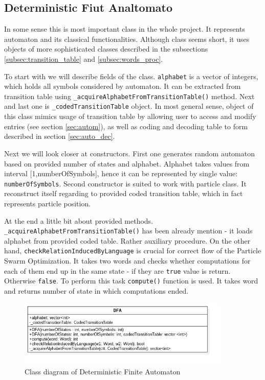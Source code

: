 \documentclass{article}
\begin{document}



%
%

\subsection{Deterministic Fiut Analtomato}
In some sense this is most important class in the whole project. It represents automaton and its classical functionalities. Although class seems short, it uses objects of more sophisticated classes described in the subsections \ref{subsec:transition_table} and \ref{subsec:words_proc}. 

To start with we will describe fields of the class. \texttt{alphabet} is a vector of integers, which holds all symbols considered by automaton. It can be extracted from transition table using \texttt{\_acquireAlphabetFromTransitionTable()} method. Next and last one is \texttt{\_codedTransitionTable} object. In most general sense, object of this class mimics usage of transition table by allowing user to access and modify entries (see section \ref{sec:autom}), as well as coding and decoding table to form described in section \ref{sec:auto_dec}. 

Next we will look closer at constructors. First one generates random automaton based on provided number of states and alphabet. Alphabet takes values from interval [1,numberOfSymbols], hence it can be represented by single value: \texttt{numberOfSymbols}. Second constructor is suited to work with particle class. It reconstruct itself regarding to provided coded transition table, which in fact represents particle position. 

At the end a little bit about provided methods. \texttt{\_acquireAlphabetFromTransitionTable()} has been already mention - it loads alphabet from provided coded table. Rather auxiliary procedure. On the other hand, \texttt{checkRelationInducedByLanguage} is crucial for correct flow of the Particle Swarm Optimization. It takes two words and checks whether computations for each of them end up in the same state - if they are \texttt{true} value is return. Otherwise \texttt{false}. To perform this task \texttt{compute()} function is used. It takes word and returns number of state in which computations ended.

\begin{figure}[H]
	\centering
	\includegraphics[width=0.9\textwidth]{images/dfa.jpg}
    \caption{Class diagram of Deterministic Finite Automaton}
    \label{fig:dfa_class}
\end{figure}
\end{document}
